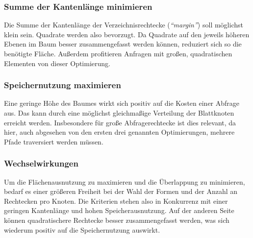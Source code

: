 \documentclass[runningheads,a4paper]{llncs}
\begin{document}
{	%

	\subsubsection{Summe der Kantenlänge minimieren} %
	\label{ssub:kantenlaenge}

	Die Summe der Kantenlänge der Verzeichnisrechtecke (\emph{\enquote{margin}}) soll möglichst klein sein. Quadrate werden also bevorzugt. Da Quadrate auf den jeweils höheren Ebenen im Baum besser zusammengefasst werden können, reduziert sich so die benötigte Fläche.
	Außerdem profitieren Anfragen mit großen, quadratischen Elementen von dieser Optimierung. \citep[vgl.][323]{Beckmann:1990}
	

	\subsubsection{Speichernutzung maximieren} %
	\label{ssub:speichernutzung_maximieren}

	Eine geringe Höhe des Baumes wirkt sich positiv auf die Kosten einer Abfrage aus. Das kann durch eine möglichst gleichmaßige Verteilung der Blattknoten erreicht werden. Insbesondere für große Abfragerechtecke ist dies relevant, da hier, auch abgesehen von den ersten drei genannten Optimierungen, mehrere Pfade traversiert werden müssen. \citep[vgl.][323-324]{Beckmann:1990}
	

	\subsubsection{Wechselwirkungen} %
	\label{ssub:wechselwirkungen}

	Um die Flächenausnutzung zu maximieren und die Überlappung zu minimieren, bedarf es einer größeren Freiheit bei der Wahl der Formen und der Anzahl an Rechtecken pro Knoten. Die Kriterien stehen also in Konkurrenz mit einer geringen Kantenlänge und hohen Speicherausnutzung. Auf der anderen Seite können quadratischere Rechtecke besser zusammengefasst werden, was sich wiederum positiv auf die Speichernutzung auswirkt. \citep[vgl.][323-324]{Beckmann:1990}
	


}
\end{document}
